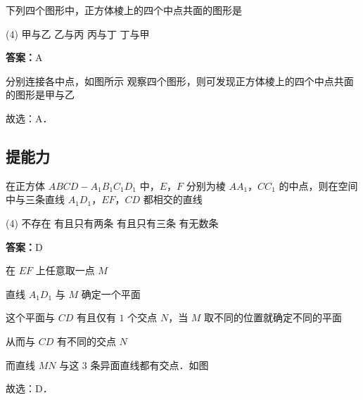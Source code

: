 \vspace{2em}


\begin{example}[\bkstar{2}{5}]
下列四个图形中，正方体棱上的四个中点共面的图形是
\begin{tasks}(4)
    \task 甲与乙
    \task 乙与丙
    \task 丙与丁
    \task 丁与甲
\end{tasks}
\end{example}
\begin{solution}
\textbf{答案：}A

分别连接各中点，如图所示
观察四个图形，则可发现正方体棱上的四个中点共面的图形是甲与乙

故选：A．
\end{solution}

\vspace{2em}

\subsection{提能力}

\begin{example}[\bkstar{3}{5}]
在正方体 $ABCD-A_1B_1C_1D_1$ 中，$E$，$F$ 分别为棱 $AA_1$，$CC_1$ 的中点，则在空间中与三条直线 $A_1D_1$，$EF$，$CD$ 都相交的直线
\begin{tasks}(4)
    \task 不存在
    \task 有且只有两条
    \task 有且只有三条
    \task 有无数条
\end{tasks}
\end{example}
\begin{solution}
\textbf{答案：}D

在 $EF$ 上任意取一点 $M$

直线 $A_1D_1$ 与 $M$ 确定一个平面

这个平面与 $CD$ 有且仅有 $1$ 个交点 $N$，当 $M$ 取不同的位置就确定不同的平面

从而与 $CD$ 有不同的交点 $N$

而直线 $MN$ 与这 $3$ 条异面直线都有交点．如图

故选：D．
\end{solution}

\vspace{2em}

